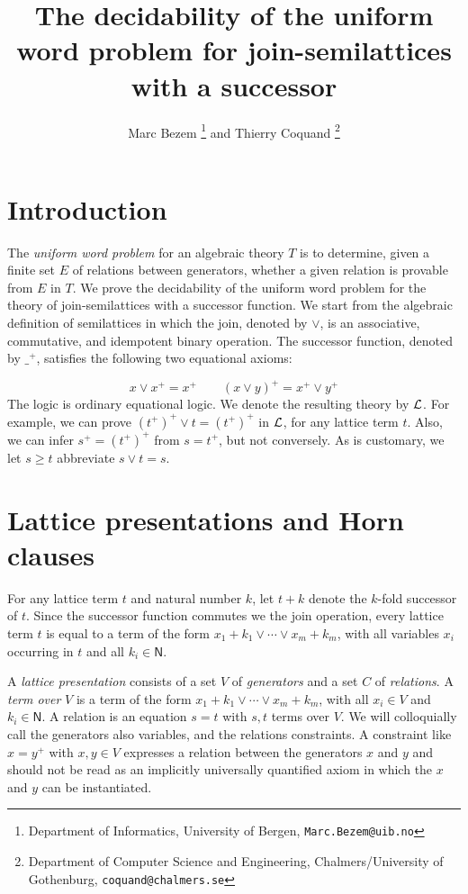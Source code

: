 \documentclass[11pt,a4paper]{article}
\newcommand{\N}{\mathsf{N}}
\newcommand\jterm[3]{{{#1_1}+{#2_1}}\vee\cdots\vee{{#1_#3}+{#2_#3}}}
\newcommand\lathy{{\cal L}}
\begin{document}
\title{The decidability of the uniform word problem
for join-semilattices with a successor}

\author{Marc Bezem%
\thanks{Department of Informatics, University of Bergen, {\tt Marc.Bezem@uib.no}}
and Thierry Coquand
\thanks{Department of Computer Science and Engineering, 
Chalmers/University of Gothenburg, {\tt coquand@chalmers.se}}
}
\date{}


\maketitle


\section{Introduction}
The \emph{uniform word problem} for an algebraic theory $T$ is
to determine, given a finite set $E$ of relations between generators,
whether a given relation is provable from $E$ in $T$.
We prove the decidability of the uniform word problem for
the theory of join-semilattices with a successor function.
We start from the algebraic definition of semilattices in which the
join, denoted by $\vee$, is an associative, commutative, and idempotent
binary operation. The successor function, denoted by ${\_}^+$,
satisfies the following two equational axioms:

\[
x \vee x^+ = x^+ \quad \quad (x\vee y)^+ = x^+ \vee y^+
\] 
The logic is ordinary equational logic.
We denote the resulting theory by $\lathy$.
For example, we can prove $(t^+)^+ \vee t = (t^+)^+$ in $\lathy$,
for any lattice term $t$. Also, we can infer $s^+ = (t^+)^+$
from $s = t^+$, but not conversely. 
As is customary, we let $s\geq t$ abbreviate $s\vee t = s$.


\section{Lattice presentations and Horn clauses}\label{sec:latt-Horn}

For any lattice term $t$ and natural number $k$, 
let $t+k$ denote the $k$-fold successor of $t$.
Since the successor function commutes we the join operation,
every lattice term $t$ is equal to a term of the
form $\jterm{x}{k}{m}$, with all variables $x_i$ occurring in $t$
and all $k_i\in \N$.

A \emph{lattice presentation} consists of a
set $V$ of \emph{generators} and
a set $C$ of \emph{relations}. A \emph{term over} $V$ is
a term of the form $\jterm{x}{k}{m}$, 
with all $x_i\in V$ and $k_i\in \N$.
A relation is an equation $s=t$ with $s,t$ terms over $V$.
We will colloquially call the generators also variables, and the
relations constraints. A constraint like $x=y^+$ with $x,y\in V$
expresses a relation between the generators $x$ and $y$ and 
should not be read as an implicitly universally quantified axiom
in which the $x$ and $y$ can be instantiated.
\end{document}

